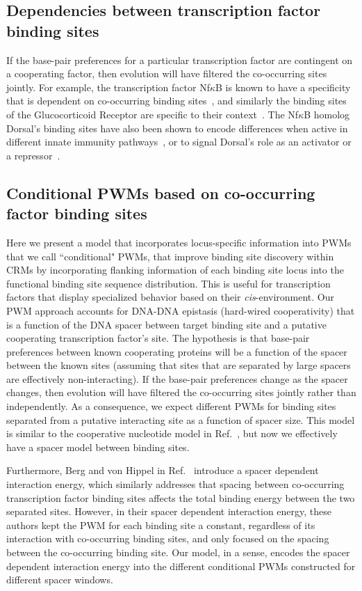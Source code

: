  \subsection{Dependencies between transcription factor binding sites}
 If the base-pair preferences for a particular transcription factor are contingent on a cooperating factor, then evolution will have filtered the co-occurring sites jointly.  For example, the transcription factor Nf$\kappa$B is known to have a specificity that is dependent on co-occurring binding sites~\cite{pmid15315758}, and similarly the binding sites of the Glucocorticoid Receptor are specific to their context~\cite{pmid19372434}.  The Nf$\kappa$B homolog Dorsal's binding sites have also been shown to encode differences when active in different innate immunity pathways~\cite{busse}, or to signal Dorsal's role as an activator or a repressor~\cite{pmid21890896}.  

\subsection{Conditional PWMs based on co-occurring factor binding sites}
Here we present a model that incorporates locus-specific information into PWMs that we call ``conditional" PWMs, that improve binding site discovery within CRMs by incorporating flanking information of each binding site locus into the functional binding site sequence distribution.  This is useful for transcription factors that display specialized behavior based on their \textit{cis}-environment.  Our PWM approach accounts for DNA-DNA epistasis (hard-wired cooperativity) that is a function of the DNA spacer between target binding site and a putative cooperating transcription factor's site.  The hypothesis is that base-pair preferences between known cooperating proteins will be a function of the spacer between the known sites (assuming that sites that are separated by large spacers are effectively non-interacting).  If the base-pair preferences change as the spacer changes, then evolution will have filtered the co-occurring sites jointly rather than independently.  As a consequence,  we expect different PWMs for binding sites separated from a putative interacting site as a function of spacer size.  This model is similar to the cooperative nucleotide model in Ref.~\cite{pmid3612791}, but now we effectively have a spacer model between binding sites.  

Furthermore, Berg and von Hippel in Ref.~\cite{pmid3612791} introduce a spacer dependent interaction energy, which similarly addresses that spacing between co-occurring transcription factor binding sites affects the total binding energy between the two separated sites.  However, in their spacer dependent interaction energy, these authors kept the PWM for each binding site a constant, regardless of its interaction with co-occurring binding sites, and only focused on the spacing between the co-occurring binding site.  Our model, in a sense, encodes the spacer dependent interaction energy into the different conditional PWMs constructed for different spacer windows. 
 
